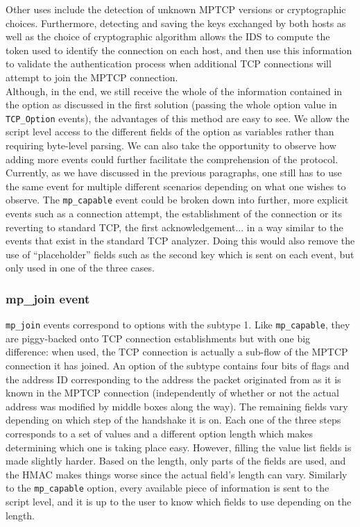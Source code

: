 Other uses include the detection of unknown MPTCP versions or cryptographic choices. Furthermore, detecting and saving the keys exchanged by both hosts as well as the choice of cryptographic algorithm allows the IDS to compute the token used to identify the connection on each host, and then use this information to validate the authentication process when additional TCP connections will attempt to join the MPTCP connection. \\

Although, in the end, we still receive the whole of the information contained in the option as discussed in the first solution (passing the whole option value in \texttt{TCP\_Option} events), the advantages of this method are easy to see. We allow the script level access to the different fields of the option as variables rather than requiring byte-level parsing. We can also take the opportunity to observe how adding more events could further facilitate the comprehension of the protocol. Currently, as we have discussed in the previous paragraphs, one still has to use the same event for multiple different scenarios depending on what one wishes to observe. The \texttt{mp\_capable} event could be broken down into further, more explicit events such as a connection attempt, the establishment of the connection or its reverting to standard TCP, the first acknowledgement... in a way similar to the events that exist in the standard TCP analyzer. Doing this would also remove the use of ``placeholder'' fields such as the second key which is sent on each event, but only used in one of the three cases.

\subsubsection{mp\_join event}
\texttt{mp\_join} events correspond to options with the subtype 1. Like \texttt{mp\_capable}, they are piggy-backed onto TCP connection establishments but with one big difference: when used, the TCP connection is actually a sub-flow of the MPTCP connection it has joined. An option of the subtype contains four bits of flags and the address ID corresponding to the address the packet originated from as it is known in the MPTCP connection (independently of whether or not the actual address was modified by middle boxes along the way). The remaining fields vary depending on which step of the handshake it is on. Each one of the three steps corresponds to a set of values and a different option length which makes determining which one is taking place easy. However, filling the value list fields is made slightly harder. Based on the length, only parts of the fields are used, and the HMAC makes things worse since the actual field's length can vary. Similarly to the \texttt{mp\_capable} option, every available piece of information is sent to the script level, and it is up to the user to know which fields to use depending on the length. \\

